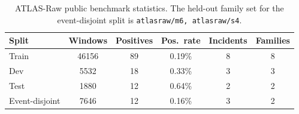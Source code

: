 \begin{table}[t]
\centering
\small
\setlength{\tabcolsep}{3.8pt}
\caption{ATLAS-Raw public benchmark statistics. The held-out family set for the event-disjoint split is \texttt{atlasraw/m6, atlasraw/s4}.}
\label{tab:atlasraw-public-stats}
\begin{tabular}{lccccc}
\toprule
Split & Windows & Positives & Pos.\ rate & Incidents & Families \\
\midrule
Train & 46156 & 89 & 0.19\% & 8 & 8 \\
Dev & 5532 & 18 & 0.33\% & 3 & 3 \\
Test & 1880 & 12 & 0.64\% & 2 & 2 \\
Event-disjoint & 7646 & 12 & 0.16\% & 3 & 2 \\
\bottomrule
\end{tabular}
\end{table}

